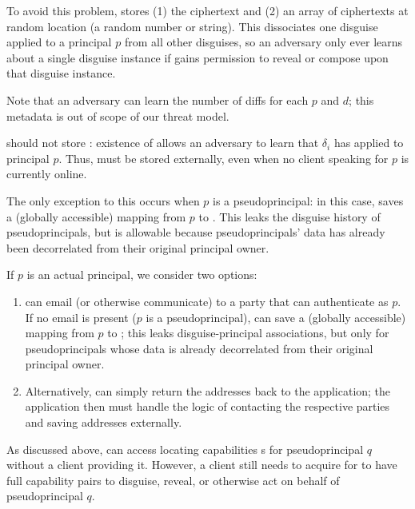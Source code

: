 To avoid this problem, \sys stores (1) the  ciphertext and (2) an array of
 ciphertexts at random location  (\eg a random number or string).
This dissociates one disguise applied to a principal $p$ from all other disguises, so an adversary only ever
learns about a single disguise instance if \sys gains permission to reveal or compose upon that
disguise instance.

Note that an adversary can learn the number of  diffs for each $p$ and $d$; this
metadata is out of scope of our threat model.

\sys should not store : existence of  allows an adversary to
learn that $\delta_i$ has applied to principal $p$. Thus,  must be stored externally,
even when no client speaking for $p$ is currently online.

The only exception to this occurs when $p$ is a pseudoprincipal: in this case, \sys saves a
(globally accessible) mapping from $p$ to . This leaks the disguise history of
pseudoprincipals, but is allowable because pseudoprincipals' data has already been decorrelated from their
original principal owner.

If $p$ is an actual principal, we consider two options: 
\begin{enumerate}
    \item \sys can email (or otherwise communicate)
 to a party that can authenticate as $p$. If no email is present (\eg $p$ is a pseudoprincipal),
\sys can save a (globally accessible) mapping from $p$ to ; this leaks disguise-principal associations, but
only for pseudoprincipals whose data is already decorrelated from their original principal owner.
\item Alternatively, \sys can simply return the addresses back to the application; the application
then must handle the logic of contacting the respective parties and saving addresses externally.
\end{enumerate}

As discussed above, \sys can access locating capabilities s for pseudoprincipal $q$ without a
client providing it. 
%
However, a client still needs to acquire  for \sys to have full capability pairs
to disguise, reveal, or otherwise act on behalf of pseudoprincipal $q$.

